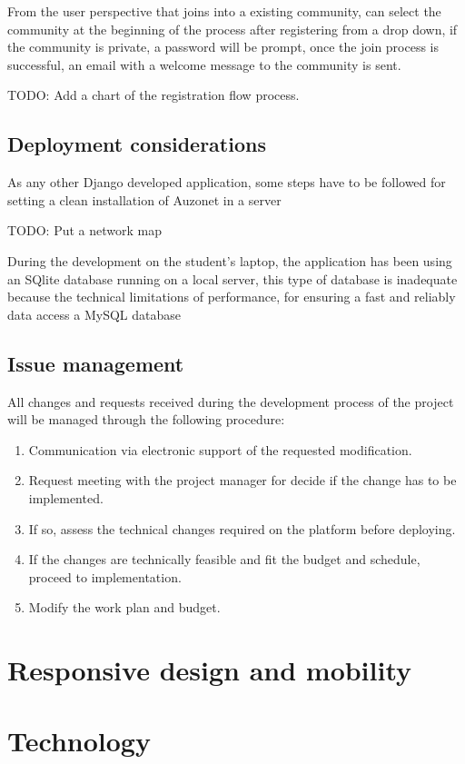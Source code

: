 \documentclass{DeustoFDP}
\begin{document}
From the user perspective that joins into a existing community, can select the community at the beginning of the process after registering from a drop down, if the community is private, a password will be prompt, once the join process is successful, an email with a welcome message to the community is sent.

TODO: Add a chart of the registration flow process.

\subsection{Deployment considerations}
As any other Django developed application, some steps have to be followed for setting a clean installation of Auzonet in a server

TODO: Put a network map

During the development on the student's laptop, the application has been using an SQlite database running on a local server, this type of database is inadequate because the technical limitations of performance, for ensuring a fast and reliably data access a MySQL database 

\subsection{Issue management}
All changes and requests received during the development process of the project will be managed through the following procedure:
\begin{enumerate}
	\item Communication via electronic support of the requested modification.
	\item Request meeting with the project manager for decide if the change has to be implemented.
	\item If so, assess the technical changes required on the platform before deploying.
	\item If the changes are technically feasible and fit the budget and schedule, proceed to implementation.
	\item Modify the work plan and budget.
\end{enumerate}
\section{Responsive design and mobility}
\section{Technology}
\end{document}
